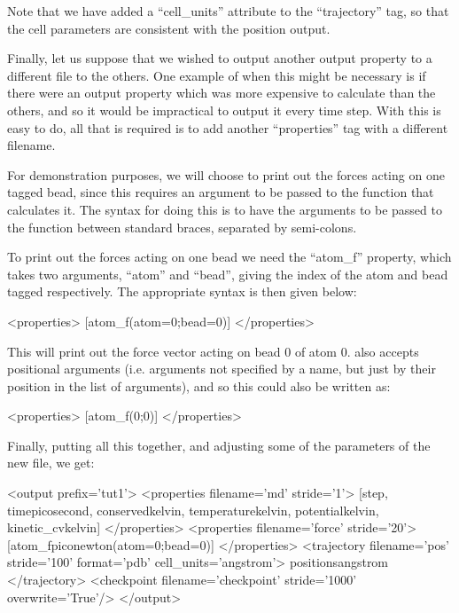 \documentclass[11pt,english,fleqn]{report}
\newenvironment{code}{%
\footnotesize 
\verbatim
}{
\endverbatim
\normalsize
}
\begin{document}
Note that we have added a {}``cell\_units'' attribute
to the {}``trajectory'' tag, so that the
cell parameters are consistent with the position output.

Finally, let us suppose that we wished to output another output property
to a different file to the others. One example of when this 
might be necessary is if there
were an output property which was more expensive to calculate than the
others, and so it would be impractical to output it every time step.
With \ipi this is easy to do, all that is required is to add another
{}``properties'' tag with a different filename.

For demonstration purposes, we will choose to print out the forces
acting on one tagged bead, since this requires an argument to be
passed to the function that calculates it. The \ipi syntax for doing this is to have
the arguments to be passed to the function between standard braces,
separated by semi-colons.

To print out the forces acting on one bead we need the {}``atom\_f''
property, which takes two arguments, {}``atom'' and {}``bead'',
giving the index of the atom and bead tagged respectively. The
appropriate syntax is then given below:

\begin{code}
<properties> 
   [atom_f(atom=0;bead=0)] 
</properties>
\end{code}

This will print out the force vector acting on bead 0 of atom 0.
\ipi also accepts positional arguments
(i.e. arguments not specified by a name, but just by their position
in the list of arguments), and so this could also be written as:

\begin{code}
<properties> 
   [atom_f(0;0)] 
</properties>
\end{code}

Finally, putting all this together, and adjusting some
of the parameters of the new file, we get:

\begin{code}
<output prefix='tut1'>
   <properties filename='md' stride='1'> 
      [step, time{picosecond}, conserved{kelvin}, 
       temperature{kelvin}, potential{kelvin}, kinetic_cv{kelvin}] 
   </properties>
   <properties filename='force' stride='20'> 
      [atom_f{piconewton}(atom=0;bead=0)] 
   </properties>
   <trajectory filename='pos' stride='100' format='pdb' cell_units='angstrom'> 
      positions{angstrom} 
   </trajectory>
   <checkpoint filename='checkpoint' stride='1000' overwrite='True'/>
</output>
\end{code}
\end{document}

